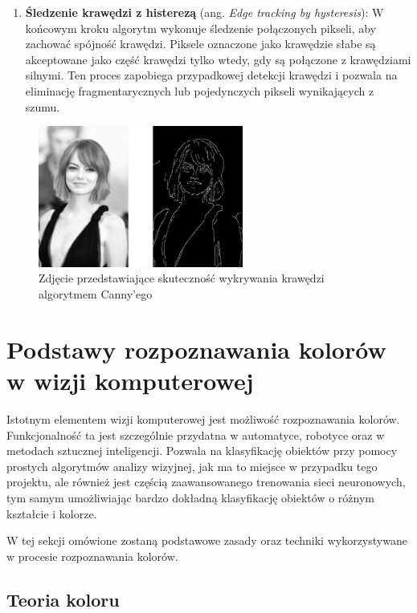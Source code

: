 \begin{enumerate}
    \item \textbf{Śledzenie krawędzi z histerezą} (ang. \textit{Edge tracking by hysteresis}): W końcowym kroku algorytm wykonuje śledzenie połączonych pikseli, aby zachować spójność krawędzi. Piksele oznaczone jako krawędzie słabe są akceptowane jako część krawędzi tylko wtedy, gdy są połączone z krawędziami silnymi. Ten proces zapobiega przypadkowej detekcji krawędzi i pozwala na eliminację fragmentarycznych lub pojedynczych pikseli wynikających z szumu.
\end{enumerate}


\begin{figure}[H]
    \centering
    \includegraphics[width=0.6\textwidth]{./graf/canny-edge.png}
    \caption{Zdjęcie przedstawiające skuteczność wykrywania krawędzi algorytmem Canny'ego}
\end{figure}

\clearpage

\section{Podstawy rozpoznawania kolorów w wizji komputerowej}

Istotnym elementem wizji komputerowej jest możliwość rozpoznawania kolorów. Funkcjonalność ta jest szczególnie przydatna w automatyce, robotyce oraz w metodach sztucznej inteligencji. Pozwala na klasyfikację obiektów przy pomocy prostych algorytmów analizy wizyjnej, jak ma to miejsce w przypadku tego projektu, ale również jest częścią zaawansowanego trenowania sieci neuronowych, tym samym umożliwiając bardzo dokładną klasyfikację obiektów o różnym kształcie i kolorze. 

W tej sekcji omówione zostaną podstawowe zasady oraz techniki wykorzystywane w procesie rozpoznawania kolorów.


\subsection{Teoria koloru}

